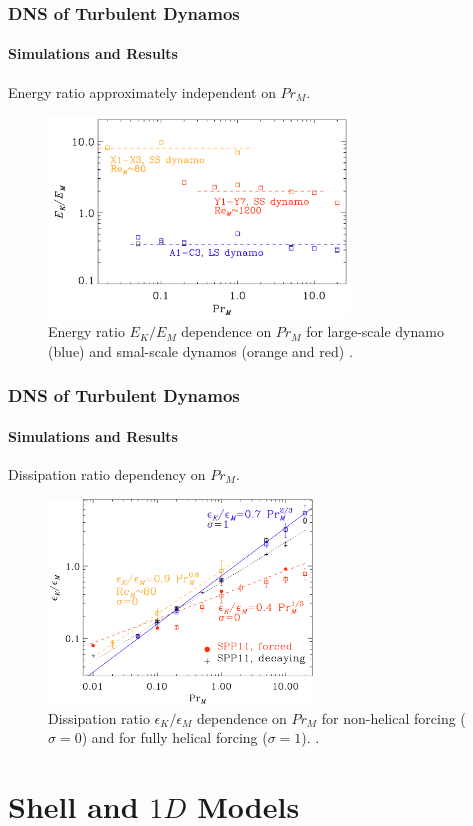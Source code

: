 \documentclass{beamer}
\begin{document}
\begin{frame}
 \frametitle{DNS of Turbulent Dynamos}
 \framesubtitle{Simulations and Results}
 
 Energy ratio approximately independent on $Pr_M$.
 
 \begin{figure}[t]
  \includegraphics[width=8cm]{img/energy_ratio}
  \caption{Energy ratio $E_K/E_M$ dependence on $Pr_M$ for large-scale dynamo (blue) and smal-scale dynamos (orange and red) \cite{brandenburg2014magnetic}.}
  \centering
 \end{figure}
 
\end{frame}

\begin{frame}
 \frametitle{DNS of Turbulent Dynamos}
 \framesubtitle{Simulations and Results}
 
 Dissipation ratio dependency on $Pr_M$.
 
 \begin{figure}[t]
  \includegraphics[width=7cm]{img/dissipation_ratio1}
  \caption{Dissipation ratio $\epsilon_K/\epsilon_M$ dependence on $Pr_M$ for non-helical forcing ($\sigma = 0$) and for fully helical forcing ($\sigma = 1$). \cite{brandenburg2014magnetic}.}
  \centering
 \end{figure}
 
\end{frame}

\section{Shell and $1D$ Models}
\end{document}
